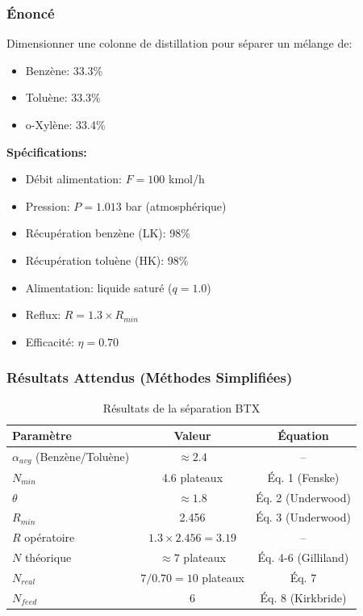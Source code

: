 \documentclass[11pt,a4paper]{article}
\begin{document}
\subsubsection{Énoncé}

Dimensionner une colonne de distillation pour séparer un mélange de:
\begin{itemize}[leftmargin=*]
    \item Benzène: 33.3\%
    \item Toluène: 33.3\%
    \item o-Xylène: 33.4\%
\end{itemize}

\textbf{Spécifications:}
\begin{itemize}[leftmargin=*]
    \item Débit alimentation: $F = 100$ kmol/h
    \item Pression: $P = 1.013$ bar (atmosphérique)
    \item Récupération benzène (LK): 98\%
    \item Récupération toluène (HK): 98\%
    \item Alimentation: liquide saturé ($q = 1.0$)
    \item Reflux: $R = 1.3 \times R_{min}$
    \item Efficacité: $\eta = 0.70$
\end{itemize}

\subsubsection{Résultats Attendus (Méthodes Simplifiées)}

\begin{table}[h]
\centering
\begin{tabular}{lcc}
\toprule
\textbf{Paramètre} & \textbf{Valeur} & \textbf{Équation} \\
\midrule
$\alpha_{avg}$ (Benzène/Toluène) & $\approx 2.4$ & -- \\
$N_{min}$ & 4.6 plateaux & Éq. 1 (Fenske) \\
$\theta$ & $\approx 1.8$ & Éq. 2 (Underwood) \\
$R_{min}$ & 2.456 & Éq. 3 (Underwood) \\
$R$ opératoire & $1.3 \times 2.456 = 3.19$ & -- \\
$N$ théorique & $\approx 7$ plateaux & Éq. 4-6 (Gilliland) \\
$N_{real}$ & $7 / 0.70 = 10$ plateaux & Éq. 7 \\
$N_{feed}$ & 6 & Éq. 8 (Kirkbride) \\
\bottomrule
\end{tabular}
\caption{Résultats de la séparation BTX}
\end{table}
\end{document}
